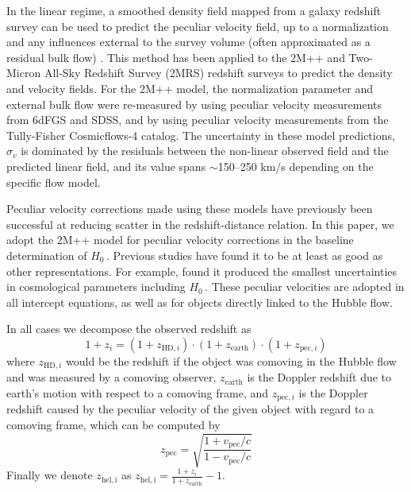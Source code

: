 In the linear regime, a smoothed density field mapped from a galaxy redshift survey can be used to predict the peculiar velocity field, up to a normalization and any influences external to the survey volume (often approximated as a residual bulk flow) \citep{1995PhR...261..271S}. This method has been applied to the 2M++ \citep{2015MNRAS.450..317C} and Two-Micron All-Sky Redshift Survey (2MRS) redshift surveys \citep{2021MNRAS.507.1557L} to predict the density and velocity fields. For the 2M++ model, the normalization parameter and external bulk flow were re-measured by \cite{2020MNRAS.497.1275S} using peculiar velocity measurements from 6dFGS and SDSS, and by \cite{2024MNRAS.531...84B} using peculiar velocity measurements from the Tully-Fisher Cosmicflows-4 catalog. The uncertainty in these model predictions, $\sigma_v$ is dominated  by the residuals between the non-linear observed field and the predicted linear field, and its value spans $\sim$150--250 km/s depending on the specific flow model. 

Peculiar velocity corrections made using these models have previously been successful at reducing scatter in the redshift-distance relation. In this paper, we adopt the 2M++ model for peculiar velocity corrections in the baseline determination of $H_0$\,. Previous studies have found it to be at least as good as other representations. For example, \cite{2023AAS...24142408P} found it produced the smallest uncertainties in cosmological parameters including $H_0$\,. These peculiar velocities are adopted in all intercept equations, as well as for objects directly linked to the Hubble flow.

In all cases we decompose the observed redshift as
\begin{equation}
    1+z_i = (1+z_{\mathrm{HD},i}) \cdot (1+z_\mathrm{earth}) \cdot (1+z_{\mathrm{pec},i})
\end{equation}
where $z_{\mathrm{HD},i}$ would be the redshift if the object was comoving in the Hubble flow and was measured by a comoving observer, $z_\mathrm{earth}$ is the Doppler redshift due to earth's motion with respect to a comoving frame, and $z_{\mathrm{pec},i}$ is the Doppler redshift caused by the peculiar velocity of the given object with regard to a comoving frame, which can be computed by
\begin{equation}
    z_\mathrm{pec} = \sqrt{\frac{1+v_\mathrm{pec}/c}{1-v_\mathrm{pec}/c}}
\end{equation}
Finally we denote $z_\mathrm{hel,i}$ as $z_\mathrm{hel,i} = \frac{1+z_i}{1+z_\mathrm{earth}}-1$.

